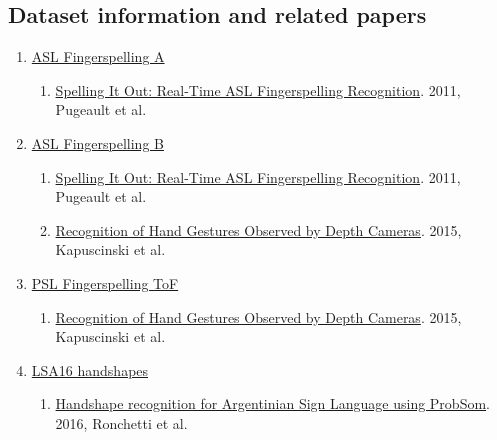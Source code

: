 \subsection{Dataset information and related
papers}\label{dataset-information-and-related-papers-1}

\begin{enumerate}
\def\labelenumi{\arabic{enumi}.}
\itemsep1pt\parskip0pt
\item
  \href{http://empslocal.ex.ac.uk/people/staff/np331/index.php?section=FingerSpellingDataset}{ASL
  Fingerspelling A}

  \begin{enumerate}
  \def\labelenumii{\arabic{enumii}.}
  \itemsep1pt\parskip0pt
  \item
    \href{http://personal.ee.surrey.ac.uk/Personal/N.Pugeault/publications/PugeaultBowden2011b.pdf}{Spelling
    It Out: Real-Time ASL Fingerspelling Recognition}. 2011, Pugeault et
    al.
  \end{enumerate}
\item
  \href{http://empslocal.ex.ac.uk/people/staff/np331/index.php?section=FingerSpellingDataset}{ASL
  Fingerspelling B}

  \begin{enumerate}
  \def\labelenumii{\arabic{enumii}.}
  \itemsep1pt\parskip0pt
  \item
    \href{http://personal.ee.surrey.ac.uk/Personal/N.Pugeault/publications/PugeaultBowden2011b.pdf}{Spelling
    It Out: Real-Time ASL Fingerspelling Recognition}. 2011, Pugeault et
    al.
  \item
    \href{http://cdn.intechopen.com/pdfs-wm/48352.pdf}{Recognition of
    Hand Gestures Observed by Depth Cameras}. 2015, Kapuscinski et al.
  \end{enumerate}
\item
  \href{http://vision.kia.prz.edu.pl/statictof.php}{PSL Fingerspelling
  ToF}

  \begin{enumerate}
  \def\labelenumii{\arabic{enumii}.}
  \itemsep1pt\parskip0pt
  \item
    \href{http://cdn.intechopen.com/pdfs-wm/48352.pdf}{Recognition of
    Hand Gestures Observed by Depth Cameras}. 2015, Kapuscinski et al.
  \end{enumerate}
\item
  \href{http://facundoq.github.io/unlp/lsa16/index.html}{LSA16
  handshapes}

  \begin{enumerate}
  \def\labelenumii{\arabic{enumii}.}
  \itemsep1pt\parskip0pt
  \item
    \href{http://journal.info.unlp.edu.ar/wp-content/uploads/2015/10/JCST-42-Paper-1.pdf}{Handshape
    recognition for Argentinian Sign Language using ProbSom}. 2016,
    Ronchetti et al.
  \end{enumerate}
\end{enumerate}
